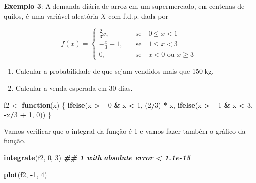 \documentclass[
]{book}
\newenvironment{Shaded}{\begin{snugshade}}{\end{snugshade}}
\newcommand{\ControlFlowTok}[1]{\textcolor[rgb]{0.13,0.29,0.53}{\textbf{#1}}}
\newcommand{\DecValTok}[1]{\textcolor[rgb]{0.00,0.00,0.81}{#1}}
\newcommand{\DocumentationTok}[1]{\textcolor[rgb]{0.56,0.35,0.01}{\textbf{\textit{#1}}}}
\newcommand{\FunctionTok}[1]{\textcolor[rgb]{0.13,0.29,0.53}{\textbf{#1}}}
\newcommand{\NormalTok}[1]{#1}
\newcommand{\OtherTok}[1]{\textcolor[rgb]{0.56,0.35,0.01}{#1}}
\newcommand{\SpecialCharTok}[1]{\textcolor[rgb]{0.81,0.36,0.00}{\textbf{#1}}}
\providecommand{\tightlist}{%
  \setlength{\itemsep}{0pt}\setlength{\parskip}{0pt}}
\begin{document}
\textbf{Exemplo 3}: A demanda diária de arroz em um supermercado, em centenas de quilos, é uma variável aleatória \(X\) com f.d.p. dada por

\[f(x) = \begin{cases}
\frac{2}{3}x,& \quad \text{se} \quad 0\leq x <1 \\
-\frac{x}{3}+1,& \quad \text{se} \quad 1\leq x<3 \\
0,& \quad \text{se} \quad x<0 \,\, \text{ou} \,\, x\geq 3
\end{cases}\]

\begin{enumerate}
\def\labelenumi{(\alph{enumi})}
\tightlist
\item
  Calcular a probabilidade de que sejam vendidos mais que 150 kg.
\item
  Calcular a venda esperada em 30 dias.
\end{enumerate}

\begin{Shaded}
\begin{Highlighting}[]
\NormalTok{f2 }\OtherTok{\textless{}{-}} \ControlFlowTok{function}\NormalTok{(x) \{}
  \FunctionTok{ifelse}\NormalTok{(x }\SpecialCharTok{\textgreater{}=} \DecValTok{0} \SpecialCharTok{\&}\NormalTok{ x }\SpecialCharTok{\textless{}} \DecValTok{1}\NormalTok{, (}\DecValTok{2}\SpecialCharTok{/}\DecValTok{3}\NormalTok{) }\SpecialCharTok{*}\NormalTok{ x,}
         \FunctionTok{ifelse}\NormalTok{(x }\SpecialCharTok{\textgreater{}=} \DecValTok{1} \SpecialCharTok{\&}\NormalTok{ x }\SpecialCharTok{\textless{}} \DecValTok{3}\NormalTok{, }\SpecialCharTok{{-}}\NormalTok{x}\SpecialCharTok{/}\DecValTok{3} \SpecialCharTok{+} \DecValTok{1}\NormalTok{, }\DecValTok{0}\NormalTok{))}
\NormalTok{\}}
\end{Highlighting}
\end{Shaded}

Vamos verificar que o integral da função é 1 e vamos fazer também o gráfico da função.

\begin{Shaded}
\begin{Highlighting}[]
\FunctionTok{integrate}\NormalTok{(f2, }\DecValTok{0}\NormalTok{, }\DecValTok{3}\NormalTok{)}
\DocumentationTok{\#\# 1 with absolute error \textless{} 1.1e{-}15}
\end{Highlighting}
\end{Shaded}

\begin{Shaded}
\begin{Highlighting}[]
\FunctionTok{plot}\NormalTok{(f2, }\SpecialCharTok{{-}}\DecValTok{1}\NormalTok{, }\DecValTok{4}\NormalTok{)}
\end{Highlighting}
\end{Shaded}
\end{document}
